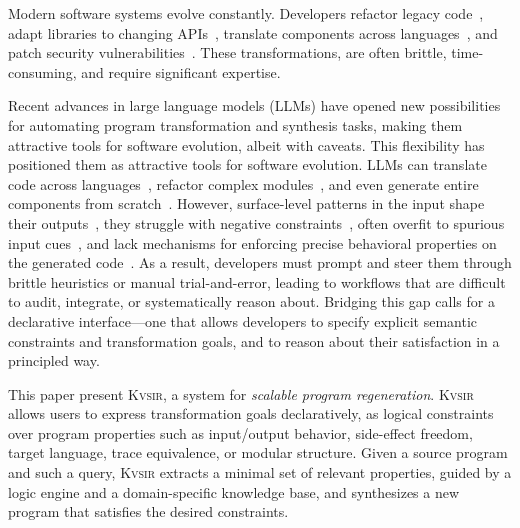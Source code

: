 \documentclass[noacm,sigplan]{acmart}
\newcommand{\sys}{{\scshape Kv{\textalpha}sir}\xspace}
\begin{document}
Modern software systems evolve constantly.
Developers refactor legacy code~\cite{Fowler99,Mens04,facebook2010redesigns,dropbox2014syncengine},
adapt libraries to changing APIs~\cite{dig2005role,kula2017empiricalstudyimpactrefactoring},
translate components across languages~\cite{manzoor_cli_python,gaultier_rewrite_cpp},
and patch security vulnerabilities~\cite{ikegami2022userefactoringsecurityvulnerability,schneier2013security_vulnerabilities}.
These transformations, are often brittle, time-consuming, and require significant expertise.

Recent advances in large language models (LLMs) have opened new possibilities for automating program transformation and synthesis tasks, making them attractive tools for software evolution, albeit with caveats.
This flexibility has positioned them as attractive tools for software evolution.
LLMs can translate code across languages~\cite{ou2025enhancingllmbasedcodetranslation},
refactor complex modules~\cite{ziftci2025migrating},
and even generate entire components from scratch~\cite{huynh2025largelanguagemodelscode}.
However, surface-level patterns in the input shape their outputs~\cite{yang2025evaluatinggeneralizationcapabilitieslarge},
they struggle with negative constraints~\cite{hwang2024thinkpinkelephant,jiang2024llmsdreamelephantswhen},
often overfit to spurious input cues~\cite{xu2023llmfoolitselfpromptbased, wu2023deceptpromptexploitingllmdrivencode},
and lack mechanisms for enforcing precise behavioral properties on the generated code~\cite{roh2025breakthechainreasoningfailuresllms}.
As a result, developers must prompt and steer them through brittle heuristics or manual trial-and-error, leading to workflows that are difficult to audit, integrate, or systematically reason about.
Bridging this gap calls for a declarative interface---one that allows developers to specify explicit semantic constraints and transformation goals, and to reason about their satisfaction in a principled way.


This paper present \sys, a system for \emph{scalable program regeneration}.
\sys allows users
to express transformation goals declaratively, as logical constraints over
program properties such as input/output behavior, side-effect freedom, target
language, trace equivalence, or modular structure.
Given a source program and
such a query, \sys extracts a minimal set of relevant properties, guided by a
logic engine and a domain-specific knowledge base, and synthesizes a new
program that satisfies the desired constraints.
\end{document}
